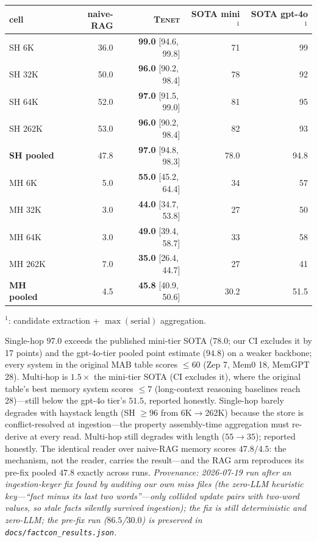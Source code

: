 \documentclass[11pt]{article}
\newcommand{\tenet}{\textsc{Tenet}}
\newcommand{\ci}[2]{{\footnotesize[#1,\,#2]}}
\begin{document}
\begin{center}
\small
\begin{tabular}{lrrrr}
\toprule
cell & naive-RAG & \tenet{} & SOTA mini$^{1}$ & SOTA gpt-4o$^{1}$\\
\midrule
SH 6K & 36.0 & \textbf{99.0} \ci{94.6}{99.8} & 71 & 99\\
SH 32K & 50.0 & \textbf{96.0} \ci{90.2}{98.4} & 78 & 92\\
SH 64K & 52.0 & \textbf{97.0} \ci{91.5}{99.0} & 81 & 95\\
SH 262K & 53.0 & \textbf{96.0} \ci{90.2}{98.4} & 82 & 93\\
\textbf{SH pooled} & 47.8 & \textbf{97.0} \ci{94.8}{98.3} & 78.0 & 94.8\\
\midrule
MH 6K & 5.0 & \textbf{55.0} \ci{45.2}{64.4} & 34 & 57\\
MH 32K & 3.0 & \textbf{44.0} \ci{34.7}{53.8} & 27 & 50\\
MH 64K & 3.0 & \textbf{49.0} \ci{39.4}{58.7} & 33 & 58\\
MH 262K & 7.0 & \textbf{35.0} \ci{26.4}{44.7} & 27 & 41\\
\textbf{MH pooled} & 4.5 & \textbf{45.8} \ci{40.9}{50.6} & 30.2 & 51.5\\
\bottomrule
\end{tabular}

$^{1}$\cite{freshness}: candidate extraction + $\max(\text{serial})$ aggregation.
\end{center}

Single-hop $97.0$ exceeds the published mini-tier SOTA ($78.0$; our CI excludes it by 17
points) and the gpt-4o-tier pooled point estimate ($94.8$) on a weaker backbone; every
system in the original MAB table scores $\le 60$ (Zep 7, Mem0 18, MemGPT 28). Multi-hop is
$1.5\times$ the mini-tier SOTA (CI excludes it), where the original table's best
memory system scores $\le 7$ (long-context reasoning baselines reach 28)---still below the
gpt-4o tier's $51.5$, reported honestly. Single-hop barely degrades with haystack length
(SH $\ge 96$ from 6K$\to$262K) because the store is conflict-resolved at ingestion---the
property assembly-time aggregation must re-derive at every read. Multi-hop still degrades
with length ($55\!\to\!35$); reported honestly. The identical reader over naive-RAG memory
scores $47.8/4.5$: the mechanism, not the reader, carries the result---and the RAG arm
reproduces its pre-fix pooled $47.8$ exactly across runs. \emph{Provenance: 2026-07-19 run
after an ingestion-keyer fix found by auditing our own miss files (the zero-LLM heuristic
key---``fact minus its last two words''---only collided update pairs with two-word values,
so stale facts silently survived ingestion); the fix is still deterministic and zero-LLM;
the pre-fix run ($86.5$/$30.0$) is preserved in \texttt{docs/factcon\_results.json}.}
\end{document}
